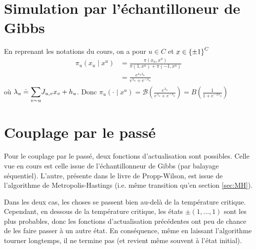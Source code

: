 \documentclass[a4paper,11pt]{article}
\begin{document}
\section{Simulation par l'échantilloneur de Gibbs}

En reprenant les notations du cours, on a pour $u \in C$ et $x \in \left\lbrace \pm 1 \right\rbrace^C$
\begin{align*}
\pi_u(x_u \mid x^u)
&= \frac{\pi(x_u,x^u)}{\pi(1,x^u) + \pi(-1,x^u)}\\
&= \frac{e^{x_u \lambda_u}}{e^{\lambda_u} + e^{-\lambda_u}}
\end{align*}
où $\lambda_u \doteq \displaystyle{\sum_{v \sim u}^{}} J_{u,v} x_v + h_u$. Donc $\pi_u(\cdot \mid x^u) = \mathcal B(\frac{e^{\lambda_u}}{e^{\lambda_u} + e^{-\lambda_u}}) = B(\frac{1}{1 + e^{-2\lambda_u}})$

\section{Couplage par le passé}

Pour le couplage par le passé, deux fonctions d'actualisation sont possibles. Celle vue en cours est celle issue de l'échantillonneur de Gibbs (par balayage séquentiel). L'autre, présente dans le livre de Propp-Wilson, est issue de l'algorithme de Metropolis-Hastings (i.e. même transition qu'en section \ref{sec:MH}).

Dans les deux cas, les choses se passent bien au-delà de la température critique. Cependant, en dessous de la température critique, les états $\pm(1,\hdots,1)$ sont les plus probables, donc les fonctions d'actualisation précédentes ont peu de chance de les faire passer à un autre état. En conséquence, même en laissant l'algorithme tourner longtemps, il ne termine pas (et revient même souvent à l'état initial).
\end{document}
